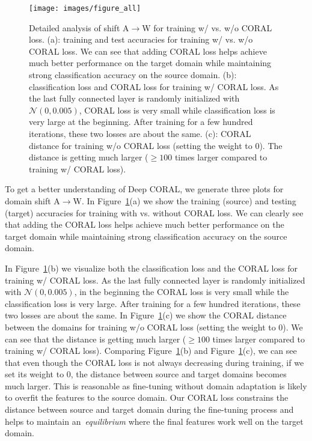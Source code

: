 \begin{figure}
\centering
\texttt{[image: images/figure\_all]}
\caption{Detailed analysis of shift A$\rightarrow$W for training w/ vs. w/o CORAL loss. (a): training and test accuracies for training w/ vs. w/o CORAL loss. We can see that adding CORAL loss helps achieve much better performance on the target domain while maintaining strong classification accuracy on the source domain. (b): classification loss and CORAL loss for training w/ CORAL loss. As the last fully connected layer is randomly initialized with $\mathcal{N}(0,0.005)$, CORAL loss is very small while classification loss is very large at the beginning. After training for a few hundred iterations, these two losses are about the same. (c): CORAL distance for training w/o CORAL loss  (setting the weight to 0). The distance is getting much larger ($\geqslant100$ times larger compared to training w/ CORAL loss).}
\label{fig:a_w}
\end{figure}

To get a better understanding of Deep CORAL, we generate three plots for domain shift A$\rightarrow$W. In Figure~\ref{fig:a_w}(a) we show the training (source) and testing (target) accuracies for training with vs. without CORAL loss. We can clearly see that adding the CORAL loss helps achieve much better performance on the target domain while maintaining strong classification accuracy on the source domain. 

In Figure~\ref{fig:a_w}(b) we visualize both the classification loss and the CORAL loss for training w/ CORAL loss. As the last fully connected layer is randomly initialized with $\mathcal{N}(0,0.005)$,  in the beginning the CORAL loss is very small while the classification loss is very large. After training for a few hundred iterations, these two losses are about the same. In Figure~\ref{fig:a_w}(c) we show the CORAL distance between the domains for training w/o CORAL loss (setting the weight to 0). We can see that the distance is getting much larger ($\geqslant100$ times larger compared to training w/ CORAL loss). Comparing Figure~\ref{fig:a_w}(b) and Figure~\ref{fig:a_w}(c), we can see that even though the CORAL loss is not always decreasing during training, if we set its weight to 0, the distance between source and target domains becomes much larger. This is reasonable as fine-tuning without domain adaptation is likely to overfit the features to the source domain. Our CORAL loss constrains the distance between source and target domain during the fine-tuning process and helps to maintain an~\emph{equilibrium} where the final features work well on the target domain.
